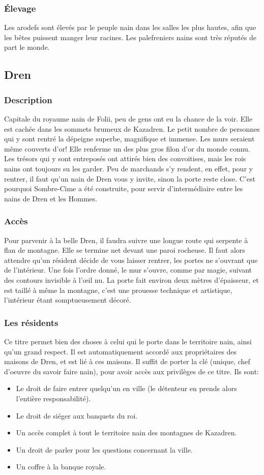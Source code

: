 \subsubsection{Élevage}
Les arodefs sont élevés par le peuple nain dans les salles les plus hautes, afin que les bêtes puissent manger leur racines. Les palefreniers nains sont très réputés de part le monde. 
\subsection{Dren}
\subsubsection{Description}
\hypertarget{dren}{}Capitale du royaume nain de Folii, peu de gens ont eu la chance de la voir.
Elle est cachée dans les sommets brumeux de Kazadren.
Le petit nombre de personnes qui y sont rentré la dépeigne superbe, magnifique et immense.
Les murs seraient même couverts d'or! 
Elle renferme un des plus gros filon d'or du monde connu.
Les trésors qui y sont entreposés ont attirés bien des convoitises, mais les rois nains ont toujours su les garder.
Peu de marchands s'y rendent, en effet, pour y rentrer, il faut qu'un nain de Dren vous y invite, sinon la porte reste close.
C'est pourquoi Sombre-Cime a été construite, pour servir d'intermédiaire entre les nains de Dren et les Hommes.
\subsubsection{Accès}
Pour parvenir à la belle Dren, il faudra suivre une longue route qui serpente à flan de montagne. Elle se termine net devant une paroi rocheuse. Il faut alors attendre qu'un résident décide de vous laisser rentrer, les portes ne s'ouvrant que de l’intérieur. Une fois l'ordre donné, le mur s'ouvre, comme par magie, suivant des contours invisible à l’œil nu. La porte fait environ deux mètres d'épaisseur, et est taillé à même la montagne, c'est une prouesse technique et artistique, l'intérieur étant somptueusement décoré.
\subsubsection{Les résidents}
Ce titre permet bien des choses à celui qui le porte dans le territoire nain, ainsi qu'un grand respect. Il est automatiquement accordé aux propriétaires des maisons de Dren, et est lié à ces maisons. Il suffit de porter la clé (unique, chef d'oeuvre du savoir faire nain), pour avoir accès aux privilèges de ce titre. Ils sont:
\begin{itemize}
\item Le droit de faire entrer quelqu'un en ville (le détenteur en prends alors l'entière responsabilité).
\item Le droit de siéger aux banquets du roi.
\item Un accès complet à tout le territoire nain des montagnes de Kazadren.
\item Un droit de parler pour les questions concernant la ville.
\item Un coffre à la banque royale.
\end{itemize}

